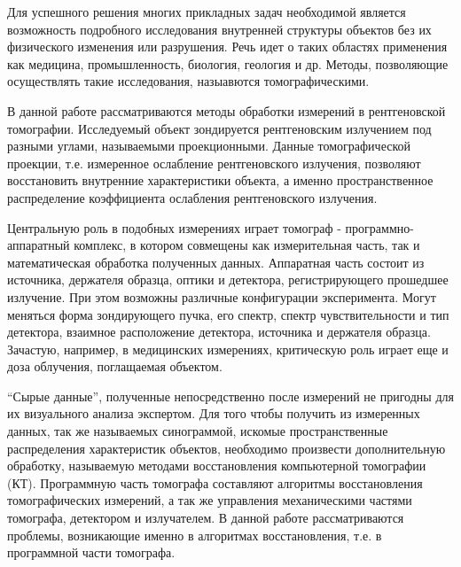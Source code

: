 Для успешного решения многих прикладных задач необходимой является возможность подробного исследования внутренней структуры объектов без их физического изменения или разрушения.
Речь идет о таких областях применения как медицина, промышленность, биология, геология и др. 
Методы, позволяющие осуществлять такие исследования, назыавются томографическими.


\begin{comment}
Современное развитие вычислительной техники, повышение ее доступности, появление новых инструментариев обработки информации, развитие алгоритмов и компьютерных наук в целом, делают возможным применение алгоритмов обработки изображений для анализа результатов томографических измерений.
\end{comment}
В данной работе рассматриваются методы обработки измерений в рентгеновской томографии.
Исследуемый объект зондируется рентгеновским излучением под разными углами, называемыми проекционными.
Данные томографической проекции, т.е. измеренное ослабление рентгеновского излучения, позволяют восстановить внутренние характеристики объекта, а именно пространственное распределение коэффициента ослабления рентгеновского излучения.

Центральную роль в подобных измерениях играет томограф - программно-аппаратный комплекс, в котором совмещены как измерительная часть, так и математическая обработка полученных данных.
Аппаратная часть состоит из источника, держателя образца, оптики и детектора, регистрирующего прошедшее излучение. 
При этом возможны различные конфигурации эксперимента. 
Могут меняться форма зондирующего пучка, его спектр, спектр чувствительности и тип детектора, взаимное расположение детектора, источника и держателя образца.
Зачастую, например, в медицинских измерениях, критическую роль играет еще и доза облучения, поглащаемая объектом.

``Сырые данные'', полученные непосредственно после измерений не пригодны для их визуального анализа экспертом.
Для того чтобы получить из измеренных данных, так же называемых синограммой, искомые пространственные распределения характеристик объектов, необходимо произвести дополнительную обработку, называемую методами восстановления компьютерной томографии (КТ).
Программную часть томографа составляют алгоритмы восстановления томографических измерений, а так же управления механическими частями томографа, детектором и излучателем.
В данной работе рассматриваются проблемы, возникающие именно в алгоритмах восстановления, т.е. в программной части томографа.


